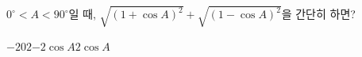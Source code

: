 $0^\circ<A<90^\circ$일 때, $\sqrt{(1+\cos A)^2}+\sqrt{(1-\cos A)^2}$을 간단히 하면?
\begin{choices32}{$-2$}{$0$}{$2$}{$-2\cos A$}{$2\cos A$}\end{choices32}
